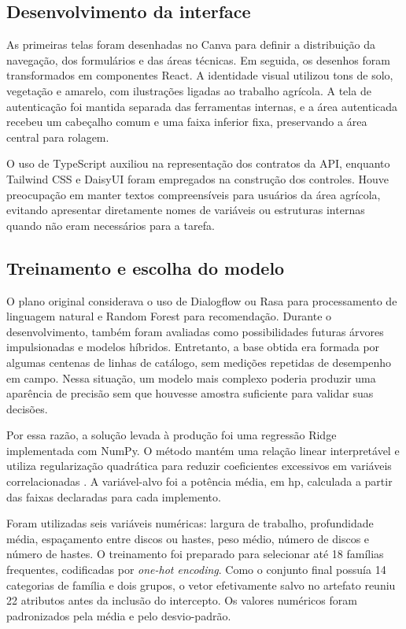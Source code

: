 \documentclass[12pt,a4paper]{article}
\begin{document}
\subsection{Desenvolvimento da interface}

As primeiras telas foram desenhadas no Canva para definir a distribuição da navegação, dos formulários e das áreas técnicas. Em seguida, os desenhos foram transformados em componentes React. A identidade visual utilizou tons de solo, vegetação e amarelo, com ilustrações ligadas ao trabalho agrícola. A tela de autenticação foi mantida separada das ferramentas internas, e a área autenticada recebeu um cabeçalho comum e uma faixa inferior fixa, preservando a área central para rolagem.

O uso de TypeScript auxiliou na representação dos contratos da API, enquanto Tailwind CSS e DaisyUI foram empregados na construção dos controles. Houve preocupação em manter textos compreensíveis para usuários da área agrícola, evitando apresentar diretamente nomes de variáveis ou estruturas internas quando não eram necessários para a tarefa.

\subsection{Treinamento e escolha do modelo}

O plano original considerava o uso de Dialogflow ou Rasa para processamento de linguagem natural e Random Forest para recomendação. Durante o desenvolvimento, também foram avaliadas como possibilidades futuras árvores impulsionadas e modelos híbridos. Entretanto, a base obtida era formada por algumas centenas de linhas de catálogo, sem medições repetidas de desempenho em campo. Nessa situação, um modelo mais complexo poderia produzir uma aparência de precisão sem que houvesse amostra suficiente para validar suas decisões.

Por essa razão, a solução levada à produção foi uma regressão Ridge implementada com NumPy. O método mantém uma relação linear interpretável e utiliza regularização quadrática para reduzir coeficientes excessivos em variáveis correlacionadas \cite{hoerl1970,hastie2009}. A variável-alvo foi a potência média, em hp, calculada a partir das faixas declaradas para cada implemento.

Foram utilizadas seis variáveis numéricas: largura de trabalho, profundidade média, espaçamento entre discos ou hastes, peso médio, número de discos e número de hastes. O treinamento foi preparado para selecionar até 18 famílias frequentes, codificadas por \textit{one-hot encoding}. Como o conjunto final possuía 14 categorias de família e dois grupos, o vetor efetivamente salvo no artefato reuniu 22 atributos antes da inclusão do intercepto. Os valores numéricos foram padronizados pela média e pelo desvio-padrão.
\end{document}
